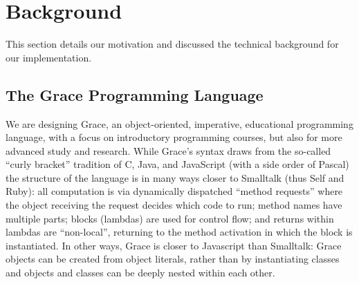 
\section{Background}
\label{sec:background}

This section details our motivation and
discussed the technical background for our implementation.


%
%

\subsection{The Grace Programming Language}
\label{ssec:grace}



We are designing Grace, an object-oriented, imperative, educational programming
language, with a focus on introductory programming
courses, but also for more advanced study and research\citep{graceOnward12,graceSigcse13}.
While Grace's syntax draws
from the so-called ``curly bracket'' tradition of C, Java, and
JavaScript (with a side order of Pascal) the structure of the language
is in many ways closer to Smalltalk (thus Self and Ruby): 
all computation is via dynamically dispatched  ``method requests''
where the object receiving the request decides which code to run;
method names
have multiple parts; blocks (lambdas) are used for control flow; and
returns within lambdas are ``non-local'', returning to the method
activation in which the block is instantiated\citep{bluebook}.  In
other ways, Grace is closer to Javascript than Smalltalk: Grace
objects can be created from object literals, rather than by
instantiating classes\citep{Black2007-emeraldHOPL,JonesECOOP2016} and
objects and classes can be deeply nested within each 
other\citep{betabook}.  

